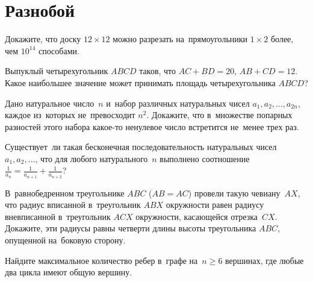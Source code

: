 
\section*{Разнобой}


\begin{problems}

\item
Докажите, что доску $12 \times 12$ можно разрезать на~прямоугольники
$1 \times 2$ более, чем $10^{14}$ способами.

\item
Выпуклый четырехугольник $ABCD$ таков, что $AC + BD = 20$, $AB + CD = 12$.
Какое наибольшее значение может принимать площадь четырехугольника $ABCD$?

\item
Дано натуральное число~$n$ и~набор различных натуральных чисел
$a_1, a_2, \ldots, a_{2n}$, каждое из~которых не~превосходит $n^2$.
Докажите, что в~множестве попарных разностей этого набора какое-то ненулевое
число встретится не~менее трех раз.

\item
Существует~ли такая бесконечная последовательность натуральных чисел
$a_1, a_2, \ldots$, что для любого натурального~$n$ выполнено соотношение
\(
    \frac{1}{a_n}
=
    \frac{1}{a_{n+1}} + \frac{1}{a_{n+2}}
\)?

\item
В~равнобедренном треугольнике $ABC$ ($AB = AC$) провели такую чевиану~$AX$, что
радиус вписанной в~треугольник $ABX$ окружности равен радиусу вневписанной
в~треугольник $ACX$ окружности, касающейся отрезка~$CX$.
Докажите, эти радиусы равны четверти длины высоты треугольника $ABC$, опущенной
на~боковую сторону.

\item
Найдите максимальное количество ребер в~графе на~$n \geq 6$ вершинах, где любые
два цикла имеют общую вершину.

\end{problems}


